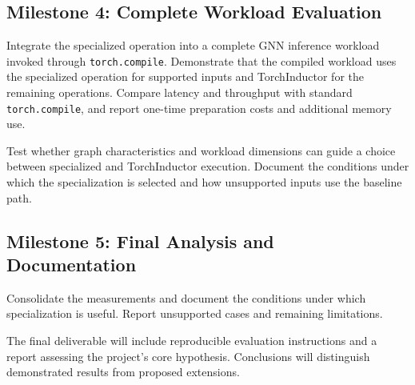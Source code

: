 \subsection{Milestone 4: Complete Workload Evaluation}

Integrate the specialized operation into a complete GNN inference workload invoked through \texttt{torch.compile}. Demonstrate that the compiled workload uses the specialized operation for supported inputs and TorchInductor for the remaining operations. Compare latency and throughput with standard \texttt{torch.compile}, and report one-time preparation costs and additional memory use.

Test whether graph characteristics and workload dimensions can guide a choice between specialized and TorchInductor execution. Document the conditions under which the specialization is selected and how unsupported inputs use the baseline path.

\subsection{Milestone 5: Final Analysis and Documentation}

Consolidate the measurements and document the conditions under which specialization is useful. Report unsupported cases and remaining limitations.

The final deliverable will include reproducible evaluation instructions and a report assessing the project's core hypothesis. Conclusions will distinguish demonstrated results from proposed extensions.
